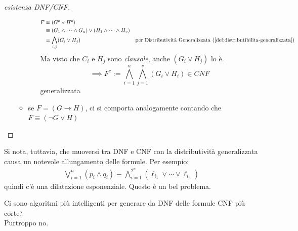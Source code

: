 \begin{proof}[esistenza DNF/CNF]
\begin{itemize}
\begin{itemize}
\begin{itemize}
\begin{align*}
              F & \equiv (G^c \lor H^c) \\ 
                & \equiv (G_1 \land \cdots \land G_u) \lor (H_1 \land \cdots \land H_v) \\
                & \equiv \bigwedge\limits_{i,j}(G_i \lor H_j) & \text{per Distributività Generalizzata}~(\ref{def:distributibilita-generalizzata})
            \end{align*}
            Ma visto che $C_i$ e $H_j$ sono \textit{clausole}, anche $(G_i \lor H_j)$ lo è.
            $$
            \implies F^c := \bigwedge\limits_{i=1}^u \bigwedge\limits_{j=1}^v (G_i \lor H_i) \in CNF
            $$generalizzata
        \end{itemize}       
      \item se $F = (G \rightarrow H)$, ci si comporta analogamente contando che $F \equiv (\neg G \lor H)$      
    \end{itemize}
\end{itemize}
\end{proof}

Si nota, tuttavia, che muoversi tra DNF e CNF con la distributività generalizzata causa un notevole allungamento delle formule. Per esempio:
\begin{align*}
        \bigvee\limits_{i = 1}^{n} (p_i \land q_i) \equiv \bigwedge\limits_{i = 1}^{2^n}(\ell_{i_1} \lor \cdots \lor \ell_{i_n})
\end{align*}
quindi c'è una dilatazione esponenziale. Questo è un bel problema.


Ci sono algoritmi più intelligenti per generare da DNF delle formule CNF più corte? \\
Purtroppo no. 
